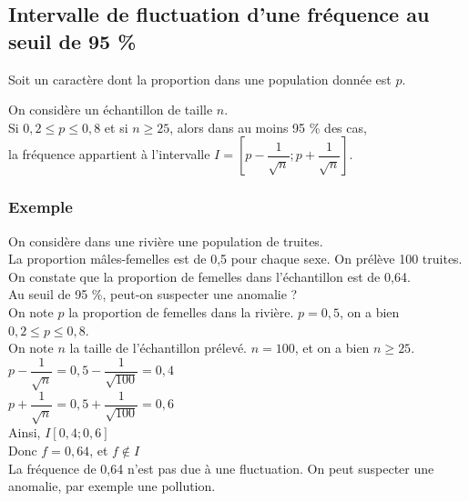 \newpage

\subsection{Intervalle de fluctuation d'une fréquence au seuil de 95  \%}

Soit un caractère dont la proportion dans une population donnée est $p$.  

On considère un échantillon de taille $n$. \\

Si $0,2\leq p \leq 0,8$ et si $n \geq 25$, alors dans au moins 95  \% des cas, \\
la fréquence appartient à l'intervalle $I = \left[p - \dfrac{1}{\sqrt{n}} ; p + \dfrac{1}{\sqrt{n}}\right]$.

\subsubsection{Exemple }

On considère dans une rivière une population de truites. \\ La proportion mâles-femelles est de 0,5 pour chaque sexe. On prélève 100 truites. \\
On constate que la proportion de femelles dans l'échantillon est de 0,64. \\
Au seuil de 95  \%, peut-on suspecter une anomalie ? \\

On note $p$ la proportion de femelles dans la rivière. $p = 0,5$, on a bien $0,2\leq p \leq 0,8$. \\

On note $n$ la taille de l'échantillon prélevé. $n = 100$, et on a bien $n \geq 25$. \\

$ p - \dfrac{1}{\sqrt{n}} = 0, 5- \dfrac{1}{\sqrt{100}} = 0,4 $ \\

$ p + \dfrac{1}{\sqrt{n}} = 0, 5 + \dfrac{1}{\sqrt{100}} = 0,6 $ \\

Ainsi, $ I \left[0,4 ; 0,6 \right]$ \\

Donc $f = 0,64$, et $f \notin I $ \\

La fréquence de 0,64 n'est pas due à une fluctuation. On peut suspecter une anomalie, par exemple une pollution. \\

